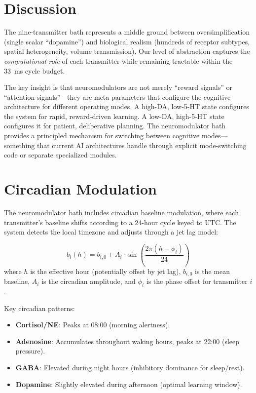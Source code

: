 \documentclass[12pt]{book}
\begin{document}
\section{Discussion}

The nine-transmitter bath represents a middle ground between oversimplification (single scalar ``dopamine'') and biological realism (hundreds of receptor subtypes, spatial heterogeneity, volume transmission). Our level of abstraction captures the \textit{computational role} of each transmitter while remaining tractable within the 33~ms cycle budget.

The key insight is that neuromodulators are not merely ``reward signals'' or ``attention signals''---they are meta-parameters that configure the cognitive architecture for different operating modes. A high-DA, low-5-HT state configures the system for rapid, reward-driven learning. A low-DA, high-5-HT state configures it for patient, deliberative planning. The neuromodulator bath provides a principled mechanism for switching between cognitive modes---something that current AI architectures handle through explicit mode-switching code or separate specialized modules.

\section{Circadian Modulation}

The neuromodulator bath includes circadian baseline modulation, where each transmitter's baseline shifts according to a 24-hour cycle keyed to UTC. The system detects the local timezone and adjusts through a jet lag model:

\begin{equation}
b_i(h) = b_{i,0} + A_i \cdot \sin\!\left(\frac{2\pi (h - \phi_i)}{24}\right)
\end{equation}
where $h$ is the effective hour (potentially offset by jet lag), $b_{i,0}$ is the mean baseline, $A_i$ is the circadian amplitude, and $\phi_i$ is the phase offset for transmitter $i$.

Key circadian patterns:
\begin{itemize}
  \item \textbf{Cortisol/NE}: Peaks at 08:00 (morning alertness).
  \item \textbf{Adenosine}: Accumulates throughout waking hours, peaks at 22:00 (sleep pressure).
  \item \textbf{GABA}: Elevated during night hours (inhibitory dominance for sleep/rest).
  \item \textbf{Dopamine}: Slightly elevated during afternoon (optimal learning window).
\end{itemize}
\end{document}

